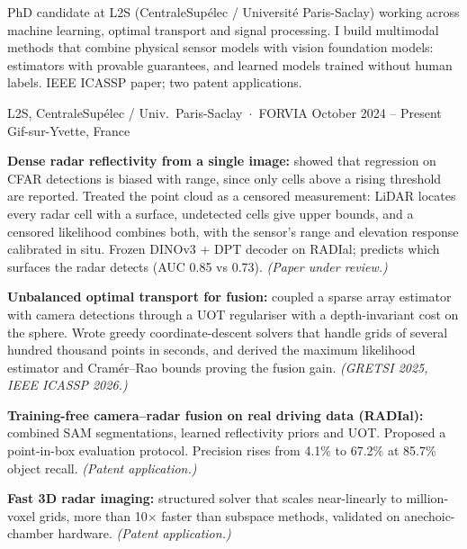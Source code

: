 




\noindent
PhD candidate at L2S (CentraleSupélec / Université Paris-Saclay) working across machine
learning, optimal transport and signal processing. I build multimodal methods that combine
physical sensor models with vision foundation models: estimators with provable guarantees, and
learned models trained without human labels. IEEE ICASSP paper; two patent applications.
\vspace{1pt}


%
        {L2S, CentraleSupélec / Univ.\ Paris-Saclay \,$\cdot$\, FORVIA}%
        {October 2024 -- Present}%
        {Gif-sur-Yvette, France}
\begin{cvitems}
  \item \textbf{Dense radar reflectivity from a single image:} showed that regression on CFAR
        detections is biased with range, since only cells above a rising threshold are reported.
        Treated the point cloud as a censored measurement: LiDAR locates every radar cell with a
        surface, undetected cells give upper bounds, and a censored likelihood combines both, with
        the sensor's range and elevation response calibrated in situ. Frozen DINOv3 + DPT decoder
        on RADIal; predicts which surfaces the radar detects (AUC 0.85 vs 0.73).
        \emph{(Paper under review.)}
  \item \textbf{Unbalanced optimal transport for fusion:} coupled a sparse array estimator with camera
        detections through a UOT regulariser with a depth-invariant cost on the sphere. Wrote
        greedy coordinate-descent solvers that handle grids of several hundred thousand points
        in seconds, and derived the maximum likelihood estimator and Cramér--Rao bounds
        proving the fusion gain. \emph{(GRETSI 2025, IEEE ICASSP 2026.)}
  \item \textbf{Training-free camera--radar fusion on real driving data (RADIal):} combined SAM
        segmentations, learned reflectivity priors and UOT. Proposed a point-in-box evaluation
        protocol. Precision rises from 4.1\% to 67.2\% at 85.7\% object recall.
        \emph{(Patent application.)}
  \item \textbf{Fast 3D radar imaging:} structured solver that scales near-linearly to
        million-voxel grids, more than 10$\times$ faster than subspace methods, validated on
        anechoic-chamber hardware. \emph{(Patent application.)}
\end{cvitems}

